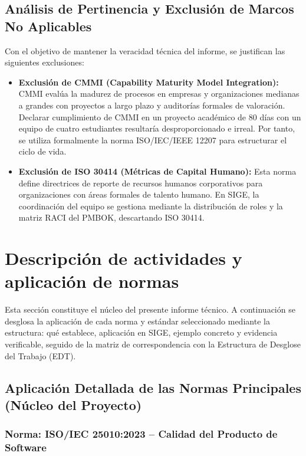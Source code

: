 \documentclass[12pt,a4paper]{article}
\begin{document}
\subsection{Análisis de Pertinencia y Exclusión de Marcos No Aplicables}
Con el objetivo de mantener la veracidad técnica del informe, se justifican las siguientes exclusiones:
\begin{itemize}[leftmargin=1.5em, itemsep=2pt]
    \item \textbf{Exclusión de CMMI (Capability Maturity Model Integration):} CMMI evalúa la madurez de procesos en empresas y organizaciones medianas a grandes con proyectos a largo plazo y auditorías formales de valoración. Declarar cumplimiento de CMMI en un proyecto académico de 80 días con un equipo de cuatro estudiantes resultaría desproporcionado e irreal. Por tanto, se utiliza formalmente la norma ISO/IEC/IEEE 12207 para estructurar el ciclo de vida.
    \item \textbf{Exclusión de ISO 30414 (Métricas de Capital Humano):} Esta norma define directrices de reporte de recursos humanos corporativos para organizaciones con áreas formales de talento humano. En SIGE, la coordinación del equipo se gestiona mediante la distribución de roles y la matriz RACI del PMBOK, descartando ISO 30414.
\end{itemize}

\section{Descripción de actividades y aplicación de normas}

Esta sección constituye el núcleo del presente informe técnico. A continuación se desglosa la aplicación de cada norma y estándar seleccionado mediante la estructura: qué establece, aplicación en SIGE, ejemplo concreto y evidencia verificable, seguido de la matriz de correspondencia con la Estructura de Desglose del Trabajo (EDT).

\subsection{Aplicación Detallada de las Normas Principales (Núcleo del Proyecto)}

\subsubsection{Norma: ISO/IEC 25010:2023 -- Calidad del Producto de Software}
\end{document}
